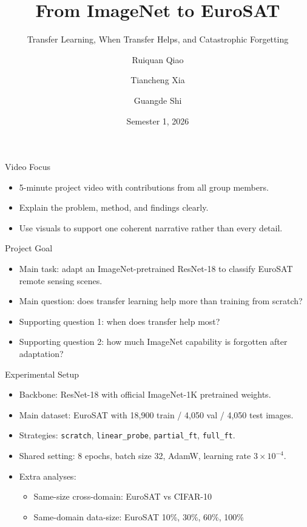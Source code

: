 \documentclass[aspectratio=169]{beamer}
\title{From ImageNet to EuroSAT}
\subtitle{Transfer Learning, When Transfer Helps, and Catastrophic Forgetting}
\author{Ruiquan Qiao \and Tiancheng Xia \and Guangde Shi}
\institute{COMP6242 Deep Learning Group Project}
\date{Semester 1, 2026}
\begin{document}
\begin{frame}
  \titlepage
\end{frame}

\begin{frame}{Video Focus}
  \begin{itemize}
    \item 5-minute project video with contributions from all group members.
    \item Explain the problem, method, and findings clearly.
    \item Use visuals to support one coherent narrative rather than every detail.
  \end{itemize}
\end{frame}

\begin{frame}{Project Goal}
  \begin{itemize}
    \item Main task: adapt an ImageNet-pretrained ResNet-18 to classify EuroSAT remote sensing scenes.
    \item Main question: does transfer learning help more than training from scratch?
    \item Supporting question 1: when does transfer help most?
    \item Supporting question 2: how much ImageNet capability is forgotten after adaptation?
  \end{itemize}
\end{frame}

\begin{frame}{Experimental Setup}
  \begin{itemize}
    \item Backbone: ResNet-18 with official ImageNet-1K pretrained weights.
    \item Main dataset: EuroSAT with 18,900 train / 4,050 val / 4,050 test images.
    \item Strategies: \texttt{scratch}, \texttt{linear\_probe}, \texttt{partial\_ft}, \texttt{full\_ft}.
    \item Shared setting: 8 epochs, batch size 32, AdamW, learning rate $3\times 10^{-4}$.
    \item Extra analyses:
    \begin{itemize}
      \item Same-size cross-domain: EuroSAT vs CIFAR-10
      \item Same-domain data-size: EuroSAT 10\%, 30\%, 60\%, 100\%
    \end{itemize}
  \end{itemize}
\end{frame}
\end{document}
